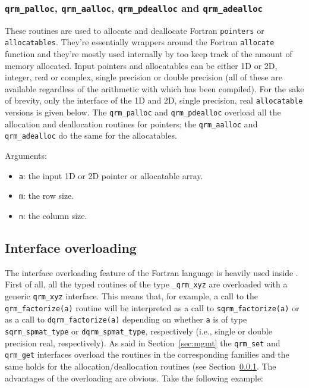 \documentclass[11pt]{article}
\begin{document}
\subsubsection{\texttt{qrm\_palloc}, \texttt{qrm\_aalloc},
  \texttt{qrm\_pdealloc} and \texttt{qrm\_adealloc}}
\label{sec:alloc}

These routines are used to allocate and deallocate Fortran
\texttt{pointers} or \texttt{allocatables}. They're essentially
wrappers around the Fortran \texttt{allocate} function and they're
mostly used internally by \qrm too keep track of the amount of memory
allocated. Input pointers and allocatables can be either 1D or 2D,
integer, real or complex, single precision or double precision (all of
these are available regardless of the arithmetic with which \qrm has
been compiled).  For the sake of brevity, only the interface of the 1D
and 2D, single precision, real \texttt{allocatable} versions is given
below. The \texttt{qrm\_palloc} and \texttt{qrm\_pdealloc} overload
all the allocation and deallocation routines for pointers; the
\texttt{qrm\_aalloc} and \texttt{qrm\_adealloc} do the same for the
allocatables.


\noindent Arguments:
\begin{itemize}
\item \texttt{a}: the input 1D or 2D pointer or allocatable array.
\item \texttt{m}: the row size.
\item \texttt{n}: the column size.
\end{itemize}



\subsection{Interface overloading}
\label{sec:iover}

The interface overloading feature of the Fortran language is heavily
used inside \qrm. First of all, all the typed routines of the type
\texttt{\_qrm\_xyz} are overloaded with a generic \texttt{qrm\_xyz}
interface. This means that, for example, a call to the
\texttt{qrm\_factorize(a)} routine will be interpreted as a call to
\texttt{sqrm\_factorize(a)} or as a call to
\texttt{dqrm\_factorize(a)} depending on whether \texttt{a} is of
type \texttt{sqrm\_spmat\_type} or  \texttt{dqrm\_spmat\_type},
respectively (i.e., single or double precision real, respectively).
As said in Section~\ref{sec:mgmt} the \texttt{qrm\_set} and
\texttt{qrm\_get} interfaces overload the routines in the
corresponding families and the same holds for the
allocation/deallocation routines (see Section~\ref{sec:alloc}. The
advantages of the overloading are obvious. Take the following example:
\end{document}
